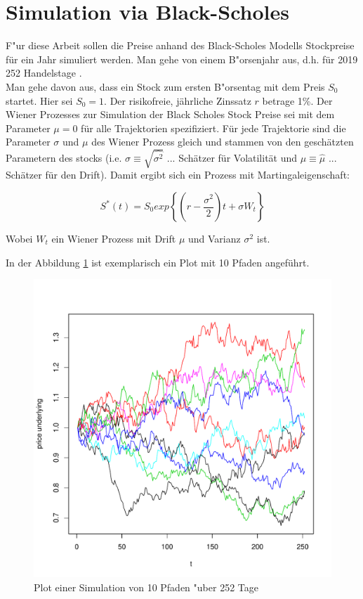 \documentclass[10pt,a4paper]{report}\usepackage[]{graphicx}\usepackage[]{color}
\makeatletter
\def\maxwidth{ %
  \ifdim\Gin@nat@width>\linewidth
    \linewidth
  \else
    \Gin@nat@width
  \fi
}
\makeatother
\begin{document}
\section{Simulation via Black-Scholes}

F"ur diese Arbeit sollen die Preise anhand des Black-Scholes Modells Stockpreise für ein Jahr simuliert werden. Man gehe von einem B"orsenjahr aus, d.h. für 2019 252 Handelstage \cite[]{boersewien2019}.\\
Man gehe davon aus, dass ein Stock zum ersten B"orsentag mit dem Preis $S_0$ startet. Hier sei $S_0=1$. Der risikofreie, jährliche Zinssatz $r$ betrage 1\%. Der Wiener Prozesses zur Simulation der Black Scholes Stock Preise sei mit dem Parameter $\mu=0$ für alle Trajektorien spezifiziert. Für jede Trajektorie sind die Parameter $\sigma$ und $\mu$ des Wiener Prozess gleich und stammen von den geschätzten Parametern des stocks (i.e. $\sigma \equiv \sqrt{\hat{\sigma^2}}$ ... Schätzer für Volatilität und $\mu \equiv \hat{\mu}$ ... Schätzer für den Drift). Damit ergibt sich ein Prozess mit Martingaleigenschaft:

$$S^*(t)=S_0 exp\left\{  (r-\frac{\sigma^2}{2})t + \sigma W_t\right\}$$

Wobei $W_t$ ein Wiener Prozess mit Drift $\mu$ und Varianz $\sigma^2$ ist.

In der Abbildung \ref{fig:pfade252} ist exemplarisch ein Plot mit 10 Pfaden angeführt.


\begin{figure}[H]

\includegraphics[width=\maxwidth]{figure/unnamed-chunk-14-1} 

\caption{Plot einer Simulation von 10 Pfaden "uber 252 Tage}
\label{fig:pfade252}
\end{figure}
\end{document}
